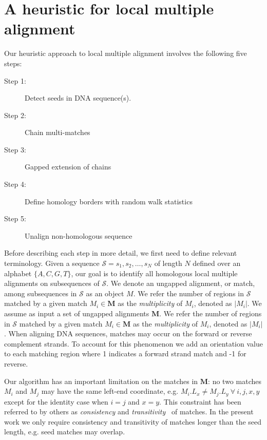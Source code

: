 \documentclass{llncs}
\begin{document}
\label{sec:overview}
\section{A heuristic for local multiple alignment}

Our heuristic approach to local multiple alignment
involves the following five steps:
\begin{description}
\item[Step 1:] Detect seeds in DNA sequence(s).
\item[Step 2:] Chain multi-matches
\item[Step 3:] Gapped extension of chains
\item[Step 4:] Define homology borders with random walk statistics
\item[Step 5:] Unalign non-homologous sequence
\end{description}

Before describing each step in more detail, we first need to define relevant terminology.
Given a sequence $\mathcal{S}=s_1, s_2,\dots, s_N$ of length $N$
defined over an alphabet $\{A,C,G,T\}$, our goal is to identify all homologous
local multiple alignments on subsequences of $\mathcal{S}$. We denote
an ungapped alignment, or match, among subsequences in $\mathcal{S}$
as an object $M$.  We refer the number of regions in $\mathcal{S}$
matched by a given match $M_i \in \mathbf{M}$ as the
\textit{multiplicity} of $M_i$, denoted as $|M_i|$.   We assume as input a set of ungapped alignments
$\mathbf{M}$.  We refer the number of regions in $\mathcal{S}$
matched by a given match $M_i \in \mathbf{M}$ as the
\textit{multiplicity} of $M_i$, denoted as $|M_i|$. When aligning DNA sequences, matches may
occur on the forward or reverse complement strands. To account for
this phenomenon we add an orientation value to each matching region 
where 1 indicates a forward strand match and -1 for reverse.

Our algorithm has an important limitation on the matches in
$\mathbf{M}$: no two matches $M_i$ and $M_j$ may have the same
left-end coordinate, e.g. $M_i.L_x \neq M_j.L_y~\forall~i, j, x, y$
except for the identity case when $i=j$ and $x=y$.  This constraint
has been referred to by others as \textit{consistency} and
\textit{transitivity}~\cite{ref-transitivity} of matches.  In the
present work we only require consistency and transitivity of matches
longer than the seed length, e.g. seed matches may overlap.
\end{document}
